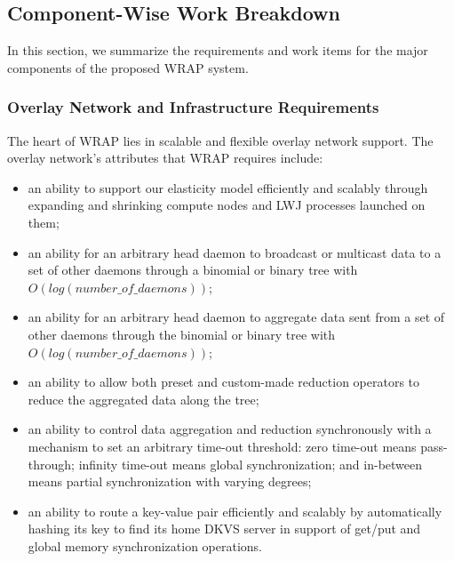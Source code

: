 \subsection{Component-Wise Work Breakdown}
In this section, we summarize the requirements and work items for
the major components of the proposed WRAP system.

\subsubsection{Overlay Network and Infrastructure Requirements}
The heart of WRAP lies in scalable and flexible overlay network support.
The overlay network's attributes that WRAP requires include: 

\begin{itemize}

\item{an ability to support our elasticity model
efficiently and scalably through expanding and shrinking
compute nodes and LWJ processes launched on them;}

\item{an ability for an arbitrary head daemon to broadcast
or multicast data to a set of other daemons through a binomial
or binary tree with $O(log(number\_of\_daemons))$;}

\item{an ability for an arbitrary head daemon to aggregate data
sent from a set of other daemons through the binomial
or binary tree with $O(log(number\_of\_daemons))$;}

\item{an ability to allow both preset and custom-made reduction
operators to reduce the aggregated data along the tree;}

\item{an ability to control data aggregation and reduction synchronously
with a mechanism to set an arbitrary time-out threshold: zero time-out means pass-through;
infinity time-out means global synchronization; and
in-between means partial synchronization with varying degrees;}

\item{an ability to route a key-value pair efficiently and
scalably by automatically hashing its key to find its home DKVS server
in support of get/put and global memory synchronization operations.}

\end{itemize}

